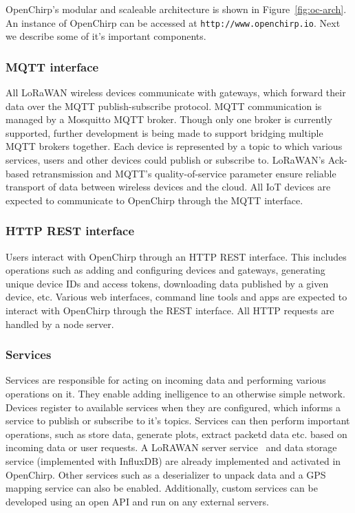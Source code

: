 \documentclass[conference]{IEEEtran}
\newcommand{\figref}[1]{Figure~\ref{fig:#1}}
\begin{document}
OpenChirp's modular and scaleable architecture is shown in \figref{oc-arch}.
An instance of OpenChirp can be accessed at \texttt{http://www.openchirp.io}.
Next we describe some of it's important components.


\subsubsection{MQTT interface}
All LoRaWAN wireless devices communicate with gateways, which forward their
data over the MQTT publish-subscribe protocol. MQTT communication is managed
by a Mosquitto MQTT broker. Though only one broker is currently supported,
further development is being made to support bridging multiple MQTT brokers
together. Each device is represented by a topic to which various services,
users and other devices could publish or subscribe to. LoRaWAN's Ack-based
retransmission and MQTT's quality-of-service parameter ensure reliable
transport of data between wireless devices and the cloud. All IoT devices are
expected to communicate to OpenChirp through the MQTT interface.

\subsubsection{HTTP REST interface}

Users interact with OpenChirp through an HTTP REST interface. This
includes operations such as adding and configuring devices and
gateways, generating unique device IDs and access tokens, downloading data
published by a given device, etc. Various web interfaces, command line tools
and apps are expected to interact with OpenChirp through the REST interface.
All HTTP requests are handled by a node server.

\subsubsection{Services}

Services are responsible for acting on incoming data and performing various
operations on it. They enable adding inelligence to an otherwise simple
network. Devices register to available services when they are configured,
which informs a service to publish or subscribe to it's topics. Services can
then perform important operations, such as store data, generate plots, extract
packetd data etc. based on incoming data or user requests. A LoRAWAN server
service~\cite{loraserver} and data storage service (implemented with InfluxDB)
are already implemented and activated in OpenChirp. Other services such as a
deserializer to unpack data and a GPS mapping service can also be enabled.
Additionally, custom services can be developed using an open API and run on
any external servers.
\end{document}

